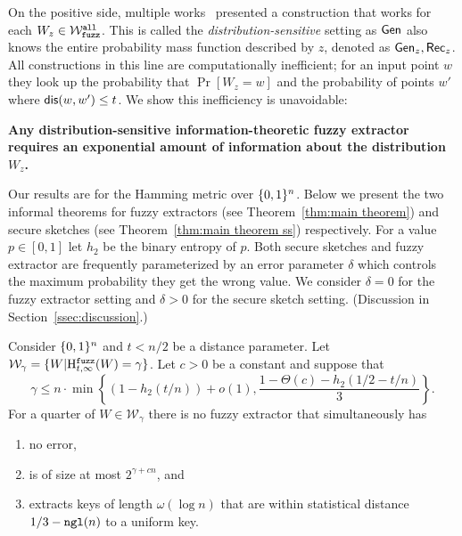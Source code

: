 On the positive side, multiple works~\cite{hayashi2014secret,hayashi2016secret,fuller2016fuzzy,woodage2017new,tyagi2017universal,TVW18,LA18,fuller2019continuous,fuller2020fuzzy} presented a construction that works for each $W_z\in \mathcal{W}_{\mathtt{fuzz}}^{\mathtt{all}}$.  This is called the \emph{distribution-sensitive} setting as ${\mathsf{Gen}}$ also knows the entire probability mass function described by $z$, denoted as ${\mathsf{Gen}}_{z}, {\mathsf{Rec}}_{z}$.  All constructions in this line are computationally inefficient; for an input point $w$ they look up the probability that $\Pr[W_z=w]$ and the probability of points $w'$ where $\mathsf{dis}(w, w')\le t$.  
We show this inefficiency is unavoidable:
\begin{displayquote}
\textbf{Any distribution-sensitive information-theoretic fuzzy extractor requires an exponential amount of information about the distribution $W_z$.} 
\end{displayquote} 
Our results are for the Hamming metric over $\{0, 1\}^n$. Below we present the two informal theorems for fuzzy extractors (see Theorem~\ref{thm:main theorem}) and secure sketches (see Theorem~\ref{thm:main theorem ss}) respectively.  For a value $p\in [0,1]$ let $h_2$ be the binary entropy of $p$. 
Both secure sketches and fuzzy extractor are frequently parameterized by an error parameter $\delta$ which controls the maximum probability they get the wrong value.  We consider $\delta=0$ for the fuzzy extractor setting and $\delta>0$ for the secure sketch setting. (Discussion in Section~\ref{ssec:discussion}.)

\begin{theorem}
Consider $\{0, 1\}^n$ and $t< n/2$ be a distance parameter.  Let $\mathcal{W}_\gamma=\{W | \mathrm{H}^{\mathtt{fuzz}}_{t,\infty}(W) = \gamma\}$.  Let $c>0$ be a constant and suppose that \[
\gamma \le n\cdot\min\left\{(1-h_2(t/n)) +o(1), \frac{1-\Theta(c)-h_2(1/2-t/n)}{3}\right\}.
\]
 For a quarter of $W \in \mathcal{W}_\gamma$ there is no fuzzy extractor that simultaneously has 
 \begin{enumerate}
 \itemsep0em
 \item no error,
 \item is of size at most $2^{\gamma+cn}$, and 
 \item extracts keys of length $\omega(\log n)$ that are within statistical distance $1/3-\mathtt{ngl}(n)$ to a uniform key.
 \end{enumerate}
\end{theorem}



